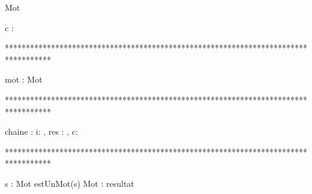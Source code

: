 \begin{algorithme}
    
    \begin{enregistrement}{Mot}%
    \end{enregistrement}

      {c : \caractere}%
      {\booleen}%
      {}%
      {
      }
\end{algorithme}

***********************************************************************************
\begin{algorithme}
       {mot : Mot}%
       {\entier}%
       {}%
       {
         

        }
\end{algorithme}

***********************************************************************************
\begin{algorithme}
     {chaine : \chaine}%
     {\booleen}%
     {i: \entier, res : \booleen, c: \caractere}%
     {     

        	{
        	}%
        	{

			   {
				  {
				  }%
		           }%
                }%
        
      }
  
\end{algorithme}

***********************************************************************************
\begin{algorithme}
    {s : \chaine}%
    {Mot}%
    {estUnMot(s)}%
    {Mot : resultat}%
    {%
    }
\end{algorithme}

